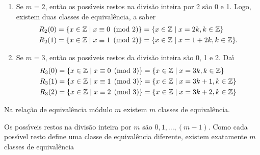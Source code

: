 \documentclass{beamer}
\begin{document}
    \begin{frame}
        \begin{exemplos}
            \begin{enumerate}[label={\arabic*})]
                \item Se $m=2$, ent{\~a}o os poss{\'\i}veis restos na divis{\~a}o inteira por 2 s{\~a}o 0 e 1. Logo, existem duas classes de equival{\^e}ncia, a saber
                \begin{align*}
                    R_{2}(0) &= \{x \in \mathbb{Z} \mid x\equiv 0 \pmod{2}\} = \{x\in \mathbb{Z} \mid x = 2k, k\in\mathbb{Z}\}\\
                    R_{2}(1) &= \{x\in\mathbb{Z} \mid x\equiv 1 \pmod{2}\} = \{x\in\mathbb{Z} \mid x = 1 + 2k, k\in\mathbb{Z}\}.
                \end{align*}
                
                \item Se $m = 3$, ent{\~a}o os poss{\'\i}veis restos da divis{\~a}o inteira s{\~a}o 0, 1 e 2. Da{\'\i}
                \begin{align*}
                    R_{3}(0) &= \{x \in \mathbb{Z} \mid x\equiv 0 \pmod{3}\} = \{x\in \mathbb{Z} \mid x = 3k, k \in \mathbb{Z}\}\\
                    R_{3}(1) & = \{x \in \mathbb{Z} \mid x\equiv 1 \pmod{3}\} = \{x\in\mathbb{Z} \mid x = 3k + 1, k \in \mathbb{Z}\}\\
                    R_{3}(2) &= \{x \in \mathbb{Z} \mid x\equiv 2 \pmod{3}\} = \{x\in\mathbb{Z} \mid x = 3k + 2, k \in \mathbb{Z}\}
                \end{align*}
            \end{enumerate} 
        \end{exemplos}
    \end{frame}

    \begin{frame}    
        \begin{proposicao}
            Na rela{\c c}{\~a}o de equival{\^e}ncia m{\'o}dulo $m$ existem $m$ classes de equival{\^e}ncia.
        \end{proposicao}
        \begin{prova}
            Os poss{\'\i}veis restos na divis{\~a}o inteira por $m$ s{\~a}o $0,1,...,(m-1)$. Como cada poss{\'\i}vel resto define uma classe de equival{\^e}ncia diferente, existem exatamente $m$ classes de equival{\^e}ncia
        \end{prova}
    \end{frame}
\end{document}
